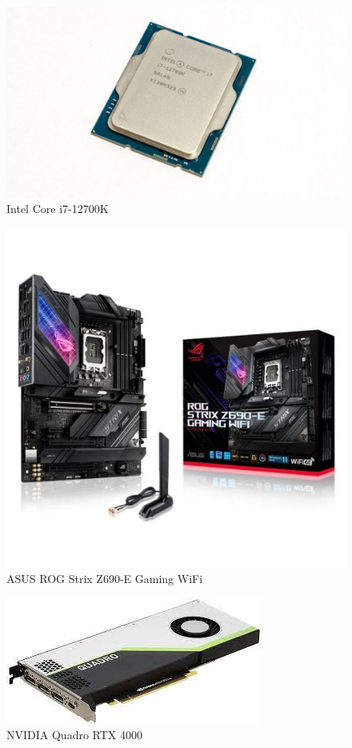 \documentclass{article}
\begin{document}
\begin{figure}
    \centering
    \includegraphics[width=0.5\linewidth]{slike/Intel.jpg}
    \caption{Intel Core i7-12700K}
\end{figure}
\begin{figure}
    \centering
    \includegraphics[width=0.5\linewidth]{slike/Asus.jpg}
    \caption{ASUS ROG Strix Z690-E Gaming WiFi}
\end{figure}
\begin{figure}
    \centering
    \includegraphics[width=0.5\linewidth]{slike/NVIDIA.jpg}
    \caption{NVIDIA Quadro RTX 4000}
\end{figure}
\end{document}
